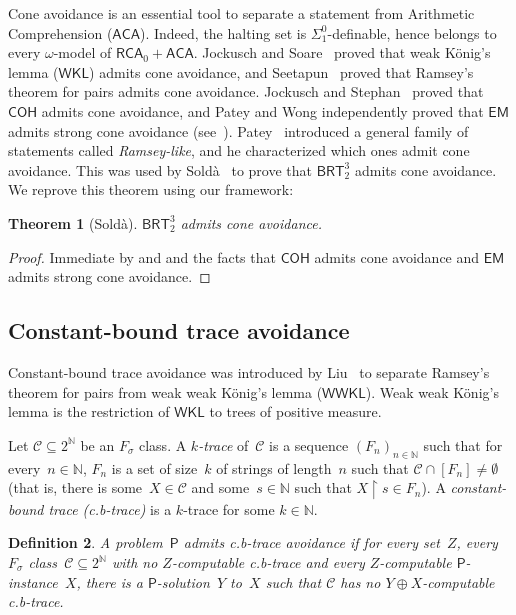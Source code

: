 \documentclass{article}
\newcommand{\Psf}{\mathsf{P}}
\def\C{\mathcal{C}}
\newcommand{\cs}{2^{\NN}}
\newcommand{\uh}{\upharpoonright}
\newcommand{\RCA}[0]{\mathsf{RCA}}
\newcommand{\WKL}[0]{\mathsf{WKL}}
\newcommand{\ACA}[0]{\mathsf{ACA}}
\newcommand{\EM}[0]{\mathsf{EM}}
\newcommand{\COH}[0]{\mathsf{COH}}
\newcommand{\BRT}[0]{\mathsf{BRT}}
\newcommand{\WWKL}[0]{\mathsf{WWKL}}
\newcommand{\NN}[0]{\mathbb{N}}
\newtheorem{theorem}{Theorem}
\numberwithin{theorem}{section}
\newtheorem{definition}[theorem]{Definition}
\begin{document}
Cone avoidance is an essential tool to separate a statement from Arithmetic Comprehension ($\ACA$). Indeed, the halting set is $\Sigma^0_1$-definable, hence belongs to every $\omega$-model of $\RCA_0 + \ACA$. Jockusch and Soare~\cite{jockusch_pi0_1_1972} proved that weak K\"onig's lemma ($\WKL$) admits cone avoidance, and Seetapun~\cite{seetapun1995strength} proved that Ramsey's theorem for pairs admits cone avoidance. 
Jockusch and Stephan~\cite{jockusch_cohesive_1993} proved that $\COH$ admits cone avoidance, and Patey and Wong independently proved that $\EM$ admits strong cone avoidance (see~\cite{levy2025weakness}).
Patey~\cite{patey2022ramseylike} introduced a general family of statements called \emph{Ramsey-like}, and he characterized which ones admit cone avoidance. This was used by Sold\`a~\cite[Section 4.1]{solda2021calibrating} to prove that $\BRT^3_2$ admits cone avoidance. We reprove this theorem using our framework:

\begin{theorem}[Sold\`a]
$\BRT^3_2$ admits cone avoidance.
\end{theorem}
\begin{proof}
Immediate by  and  and the facts that $\COH$ admits cone avoidance and $\EM$ admits strong cone avoidance.
\end{proof}

\subsection{Constant-bound trace avoidance}

Constant-bound trace avoidance was introduced by Liu~\cite{liu_cone_2010} to separate Ramsey's theorem for pairs from weak weak K\"onig's lemma ($\WWKL$). Weak weak K\"onig's lemma is the restriction of $\WKL$ to trees of positive measure.

Let $\C \subseteq \cs$ be an $F_\sigma$ class. A \emph{$k$-trace} of~$\C$ is a sequence $(F_n)_{n \in \NN}$ such that for every~$n \in \NN$, $F_n$ is a set of size~$k$ of strings of length~$n$ such that $\C \cap [F_n] \neq \emptyset$ (that is, there is some~$X \in \C$ and some~$s \in \NN$ such that $X \uh s \in F_n$). A \emph{constant-bound trace (c.b-trace)} is a $k$-trace for some $k \in \NN$.

\begin{definition}
A problem~$\Psf$ admits \emph{c.b-trace avoidance} if for every set~$Z$, every $F_\sigma$ class~$\C \subseteq \cs$ with no $Z$-computable c.b-trace and every $Z$-computable $\Psf$-instance~$X$, there is a $\Psf$-solution~$Y$ to~$X$ such that $\C$ has no $Y \oplus X$-computable c.b-trace.
\end{definition}
\end{document}
